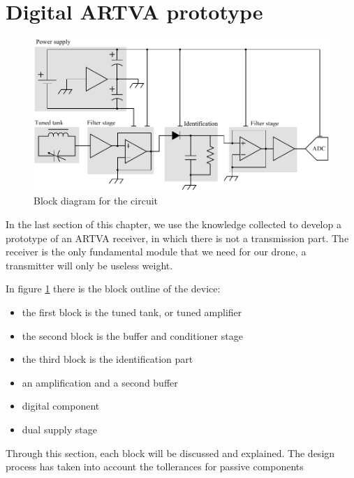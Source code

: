 \section{Digital ARTVA prototype}
\begin{figure}
	\centering
	\includegraphics[scale=0.7]{ch2/img/block_circuit.pdf}
	\caption{Block diagram for the circuit}
	\label{fig:block_circuit}	
\end{figure}
In the last section of this chapter, we use the knowledge collected to develop a prototype of an ARTVA receiver, in which there is not a transmission part. The receiver is the only fundamental module that we need for our drone, a transmitter will only be useless weight. 

In figure \ref{fig:block_circuit} there is the block outline of the device:
\begin{itemize}
\item the first block is the tuned tank, or tuned amplifier
\item the second block is the buffer and conditioner stage
\item the third block is the identification part
\item an amplification and a second buffer
\item digital component
\item dual supply stage
\end{itemize}
Through this section, each block will be discussed and explained. The design process has taken into account the tollerances for passive components

